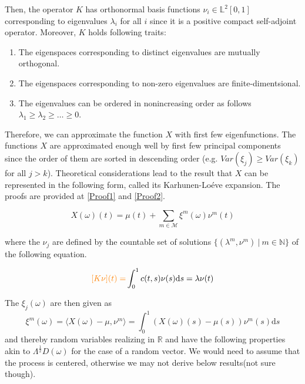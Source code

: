 \documentclass[11pt,twoside,a4paper]{article}
\begin{document}
	Then, the operator $K$ has orthonormal basis functions $\nu_{i} \in \mathbb{L}^{2}[0,1]$ corresponding to eigenvalues $\lambda_{i}$ for all $i$ since it is a positive compact self-adjoint operator. Moreover, $K$ holds following traits:
	
		\begin{enumerate}
			\item The eigenspaces corresponding to distinct eigenvalues are mutually orthogonal.
			\item The eigenspaces corresponding to non-zero eigenvalues are finite-dimentsional.
			\item The eigenvalues can be ordered in nonincreasing order as follows $\lambda_{1} \geq \lambda_{2} \geq \dots \geq 0$.
		\end{enumerate}
	
	Therefore, we can approximate the function $X$ with first few eigenfunctions. The functions $X$ are approximated enough well by first few principal components since the order of them are sorted in descending order (e.g. $Var(\xi_{j}) \geq Var(\xi_{k})$ for all $j > k$). Theoretical considerations lead to the result that $X$ can be represented in the following form, called its Karhunen-Lo\'{e}ve expansion. {\color{orange} The proofs are provided at \ref{Proof1} and \ref{Proof2}.}
	
	\begin{equation}\label{KarhunenLoeve}
		X(\omega)(t) = \mu(t) + \sum_{m \in \mathcal{M}} \xi^m(\omega) \nu^m(t)
	\end{equation}

	where the $\nu_j$ are defined by the countable set of solutions $\{(\lambda^m, \nu^m) \: \vert \: m \in \mathbb{N}\}$ of the following equation.
	
	\begin{equation}
		{\color{orange} [K \nu](t) =}\int_{0}^{1}c(t,s)\nu(s) \mathrm{d}s = \lambda \nu(t)
	\end{equation}
	
	The $\xi_j(\omega)$ are then given as 
	\begin{equation}
		\xi^m(\omega) = \langle X(\omega) - \mu, \nu^m\rangle = \int_{0}^{1} \left(X(\omega)(s) - \mu(s)\right) \nu^m(s) \mathrm{d}s
	\end{equation} 
	and thereby random variables realizing in $\mathbb{R}$ and have the following properties akin to $\Lambda^{\frac{1}{2}} D(\omega)$ for the case of a random vector. {\color{orange} We would need to assume that the process is centered, otherwise we may not derive below results(not sure though).}
	
\end{document}
